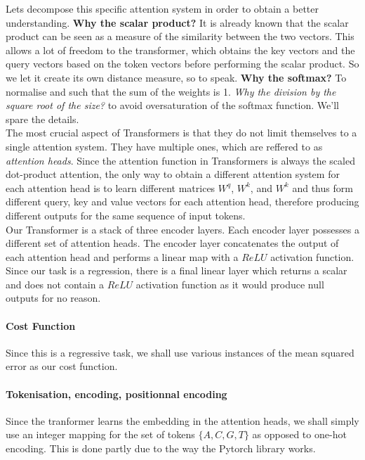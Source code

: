 \documentclass[11pt]{article}
\begin{document}
Lets decompose this specific attention system in order to obtain a better understanding.
{\bf Why the scalar product?}
It is already known that the scalar product can be seen as a measure of the similarity between
the two vectors. This allows a lot of freedom to the transformer, which obtains the key vectors and the query vectors based on the token vectors before performing the scalar product. So we let it create its own distance measure, so to speak. {\bf Why the softmax?} To normalise and such that the sum of the weights is 1. {\it Why the division by the square root of the size? } to avoid oversaturation of the softmax function. We'll spare the details.\\ The most crucial aspect of Transformers is that they do not limit themselves to a single attention system. They have multiple ones, which are reffered to as {\it attention heads}. Since the attention function in Transformers is always the scaled dot-product attention, the only way to obtain a different attention system for each attention head is to learn different matrices $W^q$, $W^k$, and $W^k$ and thus form different query, key and value vectors for each attention head, therefore producing different outputs for the same sequence of input tokens. \\
Our Transformer is a stack of three encoder layers. Each encoder layer possesses a different set of attention heads. The encoder layer concatenates the output of each attention head and performs a linear map with a $ReLU$ activation function. \\ Since our task is a regression, there is a final linear layer which returns a scalar and does not contain a $ReLU$ activation function as it would produce null outputs for no reason.

\paragraph{Cost Function}
Since this is a regressive task, we shall use various instances of the 
mean squared error as our cost function.

\paragraph{Tokenisation, encoding, positionnal encoding}
Since the tranformer learns the embedding in the attention heads\cite{transformers}, 
we shall simply use an integer mapping for the set of tokens $\{A,C,G,T\}$ as opposed to 
one-hot encoding. This is done partly due to the way the Pytorch library works.
\end{document}
